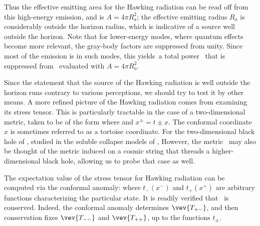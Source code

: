 Thus  the effective emitting area for the Hawking radiation can be read off from this high-energy emission, and is $A=4\pi R_a^2$; the effective emitting radius $R_a$ is considerably outside the horizon radius, which is indicative of a source well outside the horizon.
Note that for lower-energy modes, where quantum effects become more relevant, the gray-body factors are suppressed from unity.  Since most of the emission is in such modes, this yields\Page\ a total power \pagerate\ that is suppressed from \SB\ evaluated with $A=4\pi R_a^2$.

Since the statement that the source of the Hawking radiation is well outside the horizon runs contrary to various perceptions, we should try to test it by other means.  A more refined picture of the Hawking radiation comes from examining its stress tensor.  This is particularly tractable in the case of a two-dimensional metric, taken to be of the form
%
\eqn{}
%
where 
%
\eqn{}
%
and $x^\pm=t\pm x$.  
The conformal coordinate $x$ is sometimes referred to as a tortoise coordinate.  For the two-dimensional black hole of \Witt, studied in the soluble collapse models of , 
%
\eqn{}
%
However, the metric \tdmet\ may also be thought of the metric induced on a cosmic string that threads a higher-dimensional black hole, allowing us to probe that case as well.

The expectation value of the stress tensor for Hawking radiation can be computed via the conformal anomaly:
%
\eqn{}
where $t_-(x^-)$ and $t_+(x^+)$ are arbitrary functions characterizing the particular state.  It is readily verified that \stress\ is conserved.  Indeed, the conformal anomaly determines $\vev{T_{+-}}$, and then conservation fixes $\vev {T_{--}}$ and $\vev{T_{++}}$, up to the functions $t_\pm$.


